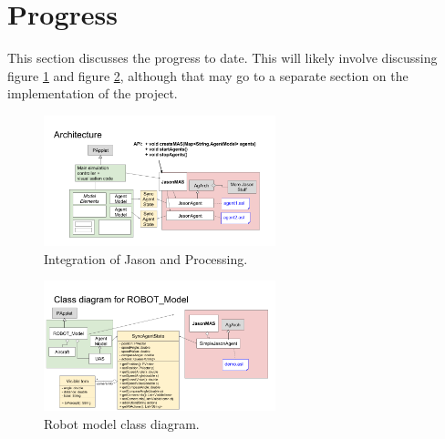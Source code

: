 \FloatBarrier
\section{Progress} \label{sec:Progress}
\FloatBarrier

This section discusses the progress to date. This will likely involve discussing figure \ref{fig:IntegrationOfJasonAndProcessing} and figure \ref{fig:RobotModelClassDiagram}, although that may go to a separate section on the implementation of the project.

\begin{figure}[!htbp]
	\begin{center}
		\includegraphics[width=0.6\textwidth,keepaspectratio]{Figures/jasonProcessingIntegration.png}
		\caption{Integration of Jason and Processing.}
		\label{fig:IntegrationOfJasonAndProcessing}
	\end{center}
\end{figure}

\begin{figure}[!htbp]
	\begin{center}
		\includegraphics[width=0.6\textwidth,keepaspectratio]{Figures/robotModelClassDiagram.png}
		\caption{Robot model class diagram.}
		\label{fig:RobotModelClassDiagram}
	\end{center}
\end{figure}